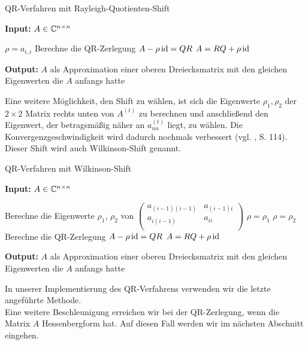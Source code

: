 \documentclass{article}
\theoremstyle{plain}
\begin{document}
\renewcommand{\algorithmicrequire}{\textbf{Input:}}
\renewcommand{\algorithmicensure}{\textbf{Output:}}

\begin{algorithm}

	\caption{QR-Verfahren mit Rayleigh-Quotienten-Shift}
	\label{QR-Verfahren_shifts_rayleigh}
	\algorithmicrequire{ $A \in \mathbb{C}^{n\times n}$}
	\begin{algorithmic}[1]
				\State $\rho = a_{i,i}$
				\State Berechne die QR-Zerlegung $A - \rho \operatorname{id} = QR$
				\State $A = RQ + \rho \operatorname{id}$
			\EndWhile
		\EndFor
	\end{algorithmic}
	\algorithmicensure{ $A$ als Approximation einer oberen Dreiecksmatrix mit den gleichen Eigenwerten die $A$ anfangs hatte}
\end{algorithm}

Eine weitere Möglichkeit, den Shift zu wählen, ist sich die Eigenwerte $\rho_1, \rho_2$ der $2 \times 2$ Matrix rechts unten von $A^{(t)}$ zu berechnen und anschließend den Eigenwert, der betragsmäßig näher an $a^{(t)}_{nn}$ liegt, zu wählen. Die Konvergenzgeschwindigkeit wird dadurch nochmals verbessert (vgl. \cite{Num}, S. 114). Dieser Shift wird auch Wilkinson-Shift genannt.


\begin{algorithm}[H]
	\label{QR-Verfahren_shifts}
	\caption{QR-Verfahren mit Wilkinson-Shift}
	\algorithmicrequire{ $A \in \mathbb{C}^{n\times n}$}
	\begin{algorithmic}[1]
		\State Berechne die Eigenwerte $\rho_1$, $\rho_2$ von $\left(\begin{array}{rr}
			a_{(i-1)(i-1)}&a_{(i-1)i}\\
			a_{i(i-1)}&a_{ii}\\
		\end{array}\right)$
		\State $\rho = \rho_1$
		\Else
		\State $\rho = \rho_2$
		\EndIf
		\State Berechne die QR-Zerlegung $A - \rho \operatorname{id} = QR$
		\State $A = RQ + \rho \operatorname{id}$
		\EndWhile
		\EndFor
	\end{algorithmic}
	\algorithmicensure{ $A$ als Approximation einer oberen Dreiecksmatrix mit den gleichen Eigenwerten die $A$ anfangs hatte}
\end{algorithm}


In unserer Implementierung des QR-Verfahrens verwenden wir die letzte angeführte Methode.\\
Eine weitere Beschleunigung erreichen wir bei der QR-Zerlegung, wenn die Matrix $A$ Hessenbergform hat. Auf diesen Fall werden wir im nächsten Abschnitt eingehen.
\end{document}
